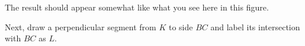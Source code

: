 \documentclass{tufte-handout}
\newcommand{\uv}{\vspace{.1in}}
\newcommand{\uvx}{\vspace{.2in}}
\begin{document}
\begin{tcolorbox}
\uvx
\begin{minipage}{0.5\textwidth}
\end{minipage} \hfill
\begin{minipage}{0.45\textwidth}
\begin{scriptsize}

\uv
The result should appear somewhat like what you see here in this figure.

\uv Next, draw a perpendicular segment from $K$ to side $BC$ and label its intersection with $BC$ as $L.$


\end{scriptsize}
\end{minipage}
\end{tcolorbox}
\pagebreak
\end{document}
